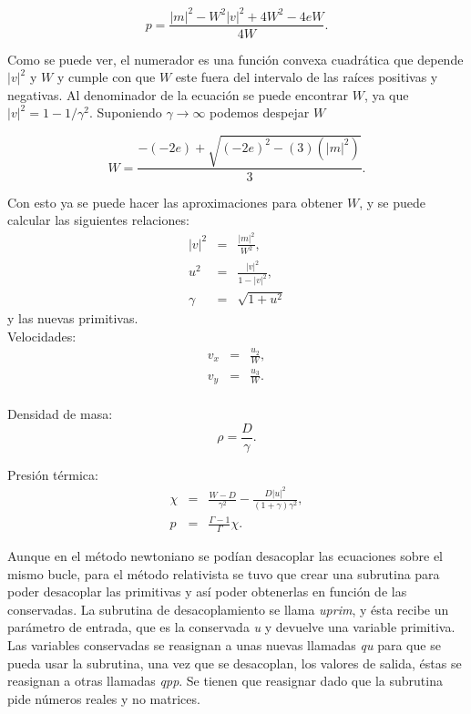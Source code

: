 \documentclass[12pt,a4paper]{book}
\providecommand{\abs}[1]{\lvert#1\rvert} %
\begin{document}
\begin{equation} \label{presion_de_newton}
p=\frac{\abs{m}^{2}-W^{2}\abs{v}^{2}+4W^{2}-4eW}{4W}.
\end{equation}

Como se puede ver, el numerador es una función convexa cuadrática que depende $\abs{v}^{2}$ y $W$ y cumple con que $W$ este fuera del intervalo de las raíces positivas y negativas.
Al denominador de la  ecuación se puede encontrar $W$, ya que $\abs{v}^{2}=1-1/\gamma^{2}$. Suponiendo $\gamma \rightarrow \infty$ podemos despejar $W$

\begin{equation}\label{suposicion_de_W}
W=\frac{-(-2e)+\sqrt{(-2e)^{2}-(3)(\abs{m}^{2})}}{3}.
\end{equation}

Con esto ya se puede hacer las aproximaciones para obtener $W$, y se puede calcular las siguientes relaciones: 
\begin{eqnarray}
\abs{v}^{2} &=& \frac{\abs{m}^{2}}{W^{2}}\label{prim_v2},\\ 
u^{2}&=&\frac{\abs{v}^{2}}{1-\abs{v}^{2}}\label{u2},\\
\gamma &=& \sqrt{1+u^{2}}
\end{eqnarray}
y las nuevas primitivas.\\
Velocidades:
\begin{eqnarray}
v_{x}&=&\frac{u_{2}}{W},\\
v_{y}&=&\frac{u_{3}}{W}.\\
\end{eqnarray}

\noindent Densidad de masa: 
\begin{equation}
\rho=\frac{D}{\gamma}.
\end{equation}

\noindent Presión térmica:
\begin{eqnarray}
\chi&=&\frac{W-D}{\gamma^{2}}-\frac{D \abs{u}^{2}}{(1+\gamma)\gamma^{2}},\\
p&=&\frac{\Gamma-1}{\Gamma} \chi.
\end{eqnarray}

Aunque en el método newtoniano se podían desacoplar las ecuaciones sobre el mismo bucle, 
para el método relativista se tuvo que crear una subrutina para poder desacoplar las primitivas y así poder obtenerlas en función de las conservadas. 
La subrutina de desacoplamiento se llama \emph{uprim}, 
y ésta recibe un parámetro de entrada, que es la conservada \emph{u} y devuelve una variable primitiva. 
Las variables conservadas se reasignan a unas nuevas llamadas \emph{qu} para que se pueda usar la subrutina, una vez que se desacoplan, 
los valores de salida, éstas se reasignan a otras llamadas \emph{qpp}. Se tienen que reasignar dado que la subrutina pide números reales y no matrices.
\end{document}
